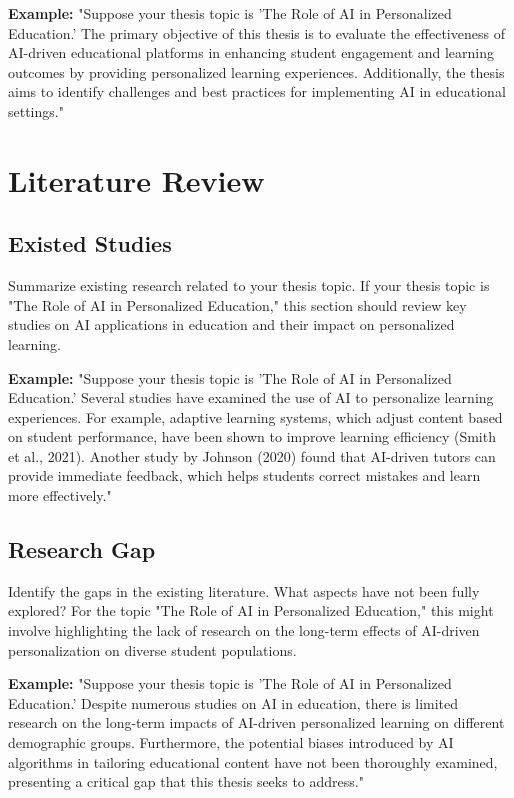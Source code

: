 \documentclass[english,f,master,binding,twoside,palatino, scrreprt]{WeSTthesis}
\begin{document}
\textbf{Example:}  
"Suppose your thesis topic is 'The Role of AI in Personalized Education.' The primary objective of this thesis is to evaluate the effectiveness of AI-driven educational platforms in enhancing student engagement and learning outcomes by providing personalized learning experiences. Additionally, the thesis aims to identify challenges and best practices for implementing AI in educational settings."

\chapter{Literature Review}

\section{Existed Studies}
Summarize existing research related to your thesis topic. If your thesis topic is "The Role of AI in Personalized Education," this section should review key studies on AI applications in education and their impact on personalized learning.

\textbf{Example:}  
"Suppose your thesis topic is 'The Role of AI in Personalized Education.' Several studies have examined the use of AI to personalize learning experiences. For example, adaptive learning systems, which adjust content based on student performance, have been shown to improve learning efficiency (Smith et al., 2021). Another study by Johnson (2020) found that AI-driven tutors can provide immediate feedback, which helps students correct mistakes and learn more effectively."

\section{Research Gap}
Identify the gaps in the existing literature. What aspects have not been fully explored? For the topic "The Role of AI in Personalized Education," this might involve highlighting the lack of research on the long-term effects of AI-driven personalization on diverse student populations.

\textbf{Example:}  
"Suppose your thesis topic is 'The Role of AI in Personalized Education.' Despite numerous studies on AI in education, there is limited research on the long-term impacts of AI-driven personalized learning on different demographic groups. Furthermore, the potential biases introduced by AI algorithms in tailoring educational content have not been thoroughly examined, presenting a critical gap that this thesis seeks to address."
\end{document}
